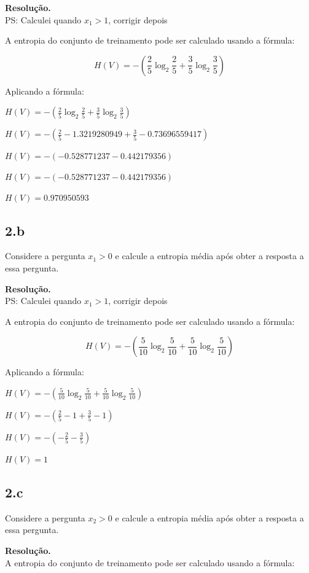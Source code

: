 \documentclass[12pt,letterpaper]{article}
\newcommand\answer{\textbf{Resolução.}\xspace}
\begin{document}
\answer \\

PS: Calculei quando $x_1 > 1$, corrigir depois

A entropia do conjunto de treinamento pode ser calculado usando a fórmula:

\[
	H(V) = - (\frac{2}{5}\log_2\frac{2}{5} + \frac{3}{5}\log_2\frac{3}{5})
\]

Aplicando a fórmula:

$H(V) = - (\frac{2}{5}\log_2\frac{2}{5} + \frac{3}{5}\log_2\frac{3}{5})$

$H(V) = - (\frac{2}{5}-1.3219280949 + \frac{3}{5}-0.73696559417)$

$H(V) = - (-0.528771237 -0.442179356)$

$H(V) = - (-0.528771237 -0.442179356)$

$H(V) = 0.970950593$

\subsection*{2.b}

Considere a pergunta $x_1 > 0$ e calcule a entropia média após obter a resposta a essa pergunta.

\answer \\

PS: Calculei quando $x_1 > 1$, corrigir depois

A entropia do conjunto de treinamento pode ser calculado usando a fórmula:

\[
	H(V) = - (\frac{5}{10}\log_2\frac{5}{10} + \frac{5}{10}\log_2\frac{5}{10})
\]

Aplicando a fórmula:

$H(V) = - (\frac{5}{10}\log_2\frac{5}{10} + \frac{5}{10}\log_2\frac{5}{10})$

$H(V) = - (\frac{2}{5}-1 + \frac{3}{5}-1)$

$H(V) = - (-\frac{2}{5} - \frac{3}{5})$

$H(V) = 1$

\subsection*{2.c}

Considere a pergunta $x_2 > 0$ e calcule a entropia média após obter a resposta a essa pergunta.

\answer \\

A entropia do conjunto de treinamento pode ser calculado usando a fórmula:
\end{document}
